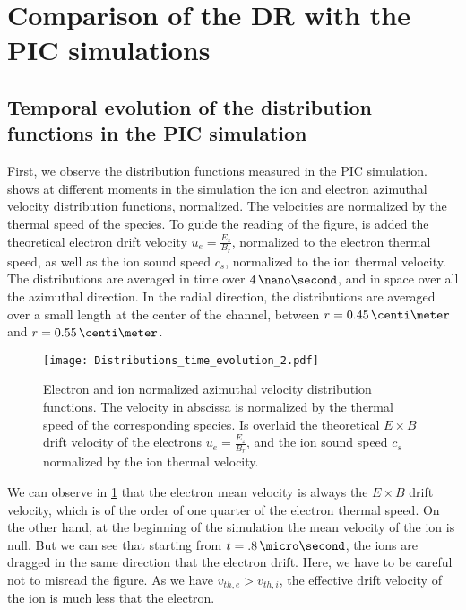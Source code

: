 \FloatBarrier
\section{Comparison of the \ac{DR} with the \ac{PIC} simulations}
  \label{sec-DR-results}
  
  

  \subsection{Temporal evolution of the distribution functions in the \ac{PIC} simulation} \label{subsec-VDFpic}
  
  First, we observe the distribution functions measured in the \ac{PIC} simulation.
   shows at different moments in the simulation the ion and electron azimuthal velocity distribution functions, normalized.
  The velocities are normalized by the thermal speed of the species.
  To guide the reading of the figure, is added the  theoretical electron drift velocity $u_e = \frac{E_z}{B_r}$, normalized to the electron thermal speed, as well as the ion sound speed $c_s$, normalized to the ion thermal velocity.
  The distributions are averaged in time over $4\,\nano\second$, and in space over all the azimuthal direction.
  In the radial direction, the distributions are averaged over a small length at the center of the channel, between $r=0.45\,\centi\meter$ and $r=0.55\,\centi\meter$.
  
  \begin{figure}[hbt]
    \centering
    \texttt{[image: Distributions\_time\_evolution\_2.pdf]}
    \caption{Electron and ion normalized azimuthal velocity distribution functions. The velocity in abscissa is normalized by the thermal speed of the corresponding species. Is overlaid the theoretical $E\times B$ drift velocity of the electrons $u_e = \frac{E_z}{B_r}$, and the ion sound speed $c_s$ normalized by the ion thermal velocity.}
    \label{fig-vdfs_pic_time}
  \end{figure}
  
  We can observe in \cref{fig-vdfs_pic_time} that the electron mean velocity is always the $E \times B$ drift velocity, which is of the order of one quarter of the electron thermal speed.
  On the other hand, at the beginning of the simulation the mean velocity of the ion is null.
  But we can see that starting from $t=.8\,\micro\second$, the ions are dragged in the same direction that the electron drift.
  Here, we have to be careful not to misread the figure.
  As we have $v_{th, e} > v_{th, i}$, the effective drift velocity of the ion is much less that the electron.
  

